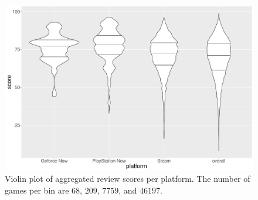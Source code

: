 

\begin{figure}[!t]
	\centering
	\includegraphics[width=1.0\columnwidth]{images/scores-by-platform-violin.pdf}
	\caption{Violin plot of aggregated review scores per platform. The number of games per bin are $68$, $209$, $7759$, and $46197$.}
\label{fig:scores-by-platform}
\end{figure}


